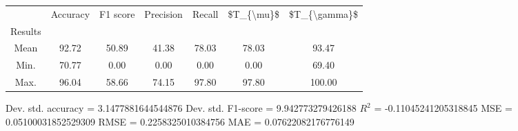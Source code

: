 \begin{tabular}{|c|c|c|c|c|c|c|}
\toprule
{} &  Accuracy &  F1 score &  Precision &  Recall &  \$T\_\{\textbackslash mu\}\$ &  \$T\_\{\textbackslash gamma\}\$ \\
Results &           &           &            &         &            &               \\
\hline
Mean    &     92.72 &     50.89 &      41.38 &   78.03 &      78.03 &         93.47 \\
Min.    &     70.77 &      0.00 &       0.00 &    0.00 &       0.00 &         69.40 \\
Max.    &     96.04 &     58.66 &      74.15 &   97.80 &      97.80 &        100.00 \\
\bottomrule
\end{tabular}

 Dev. std. accuracy = 3.1477881644544876
 Dev. std. F1-score = 9.942773279426188
 $R^2$ = -0.11045241205318845
 MSE = 0.05100031852529309
 RMSE = 0.2258325010384756
 MAE = 0.07622082176776149